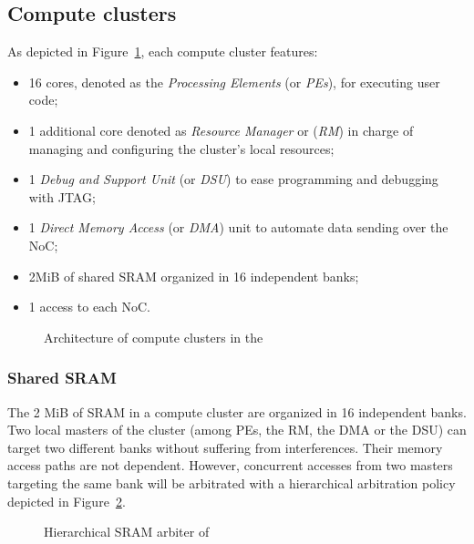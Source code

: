 \documentclass[main.tex]{subfiles}
\begin{document}
\subsection{Compute clusters}
As depicted in Figure~\ref{fig_execModel_MPPAComputeCluster}, each compute cluster features:
\begin{itemize}
    \item 16 cores, denoted as the \emph{Processing Elements} (or \emph{PEs}), for executing user code;
    \item 1 additional core denoted as \emph{Resource Manager} or (\emph{RM}) in charge of managing and configuring the cluster's local resources;
    \item 1 \emph{Debug and Support Unit} (or \emph{DSU}) to ease programming and debugging with JTAG;
    \item 1 \emph{Direct Memory Access} (or \emph{DMA}) unit to automate data sending over the NoC;
    \item 2MiB of shared SRAM organized in 16 independent banks;
    \item 1 access to each NoC.
\end{itemize}



\begin{figure}
    \centering
    \scalebox{0.8}{}
    \caption{Architecture of compute clusters in the \mppalong}
    \label{fig_execModel_MPPAComputeCluster}
\end{figure}


\subsubsection{Shared SRAM}
The 2 MiB of SRAM in a compute cluster are organized in 16 independent banks. Two local masters of the cluster (among PEs, the RM, the DMA or the DSU) can target two different banks without suffering from interferences. Their memory access paths are not dependent. However, concurrent accesses from two masters targeting the same bank will be arbitrated with a hierarchical arbitration policy depicted in Figure~\ref{fig_execModel_MPPASMEMarbiter}.
\begin{figure}
    \centering
    \scalebox{0.8}{}
    \caption{Hierarchical SRAM arbiter of \mppalong}
    \label{fig_execModel_MPPASMEMarbiter}
\end{figure}
\end{document}
